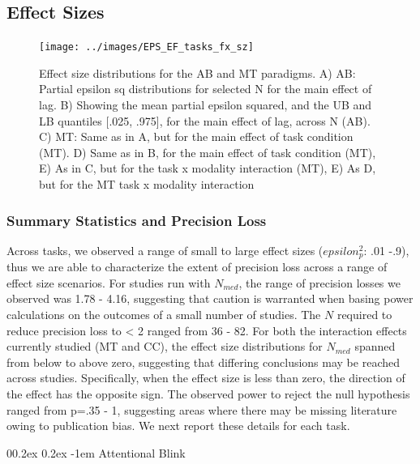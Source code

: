 \documentclass[
  man]{apa6}
\makeatletter
\let\oldparagraph\paragraph
\renewcommand{\paragraph}[1]{\oldparagraph{#1}\mbox{}}
\renewcommand{\paragraph}{\@startsection{paragraph}{4}{\parindent}%
  {0\baselineskip \@plus 0.2ex \@minus 0.2ex}%
  {-1em}%
  {\normalfont\normalsize\bfseries\itshape\typesectitle}}
\makeatother
\begin{document}
\hypertarget{effect-sizes-1}{%
\subsection{Effect Sizes}\label{effect-sizes-1}}

\begin{figure}

{\centering \texttt{[image: ../images/EPS\_EF\_tasks\_fx\_sz]} 

}

\caption{Effect size distributions for the AB and MT paradigms. A) AB: Partial epsilon sq distributions for selected N for the main effect of lag. B) Showing the mean partial epsilon squared, and the UB and LB quantiles [.025, .975], for the main effect of lag, across N (AB). C) MT: Same as in A, but for the main effect of task condition (MT). D) Same as in B, for the main effect of task condition (MT), E) As in C, but for the task x modality interaction (MT), E) As D, but for the MT task x modality interaction}\label{fig:attEFfx}
\end{figure}

\hypertarget{summary-statistics-and-precision-loss}{%
\subsubsection{Summary Statistics and Precision Loss}\label{summary-statistics-and-precision-loss}}

Across tasks, we observed a range of small to large effect sizes (\(epsilon_{p}^2\): .01 -.9), thus we are able to characterize the extent of precision loss across a range of effect size scenarios. For studies run with \(N_{med}\), the range of precision losses we observed was 1.78 - 4.16, suggesting that caution is warranted when basing power calculations on the outcomes of a small number of studies. The \(N\) required to reduce precision loss to \textless{} 2 ranged from 36 - 82. For both the interaction effects currently studied (MT and CC), the effect size distributions for \(N_{med}\) spanned from below to above zero, suggesting that differing conclusions may be reached across studies. Specifically, when the effect size is less than zero, the direction of the effect has the opposite sign. The observed power to reject the null hypothesis ranged from p=.35 - 1, suggesting areas where there may be missing literature owing to publication bias. We next report these details for each task.

\hypertarget{attentional-blink-2}{%
\paragraph{Attentional Blink}\label{attentional-blink-2}}
\end{document}
